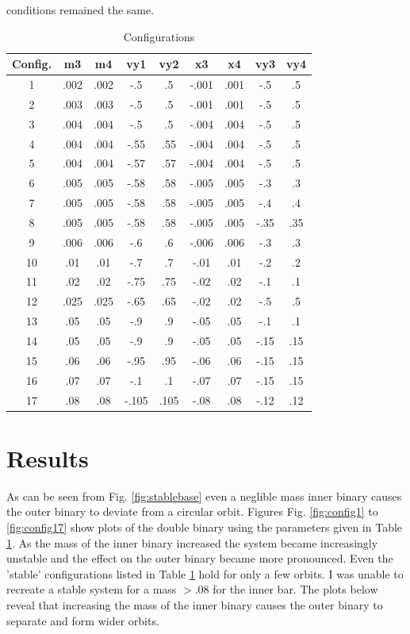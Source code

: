 \documentclass[a4paper,12pt]{article}
\begin{document}
conditions remained the same.
\begin{table}[ht!]
  \centering
  \caption{Configurations}
  \label{tab:variables}
  \begin{tabular}{ccccccccc}
   Config. & m3 & m4 & vy1 & vy2 & x3 & x4 & vy3 & vy4\\
    \hline
   1 & .002 & .002 & -.5 & .5 & -.001 & .001 & -.5 & .5\\
   2 & .003 & .003 & -.5 & .5 & -.001 & .001 & -.5 & .5\\
   3 & .004 & .004 & -.5 & .5 & -.004 & .004 & -.5 & .5\\
   4 & .004 & .004 & -.55 & .55 & -.004 & .004 & -.5 & .5\\
   5 & .004 & .004 & -.57 & .57 & -.004 & .004 & -.5 & .5\\
   6 & .005 & .005 & -.58 & .58 & -.005 & .005 & -.3 & .3\\
   7 & .005 & .005 & -.58 & .58 & -.005 & .005 & -.4 & .4\\
   8 & .005 & .005 & -.58 & .58 & -.005 & .005 & -.35 & .35\\
   9 & .006 & .006 & -.6 & .6 & -.006 & .006 & -.3 & .3\\
   10 & .01 & .01 & -.7 & .7 & -.01 & .01 & -.2 & .2\\
   11 & .02 & .02 & -.75 & .75 & -.02 & .02 & -.1 & .1\\
   12 & .025 & .025 & -.65 & .65 & -.02 & .02 & -.5 & .5\\
   13 & .05 & .05 & -.9 & .9 & -.05 & .05 & -.1 & .1\\
   14 & .05 & .05 & -.9 & .9 & -.05 & .05 & -.15 & .15\\
   15 & .06 & .06 & -.95 & .95 & -.06 & .06 & -.15 & .15\\
   16 & .07 & .07 & -.1 & .1 & -.07 & .07 & -.15 & .15\\
   17 & .08 & .08 & -.105 & .105 & -.08 & .08 & -.12 & .12\\
  \end{tabular}
\end{table}

\section{Results}
As can be seen from Fig. \ref{fig:stablebase} even a neglible mass inner binary causes the outer binary to deviate from a circular orbit.
Figures Fig. \ref{fig:config1} to \ref{fig:config17} show plots of the double binary using the parameters given in Table \ref{tab:variables}.
As the mass of the inner binary increased the system became increasingly unstable and the effect on the outer binary became more pronounced.
Even the 'stable' configurations listed in Table \ref{tab:variables} hold for only a few orbits.
I was unable to recreate a stable system for a mass $>.08$ for the inner bar.
The plots below reveal that increasing the mass of the inner binary causes the outer binary to separate and
form wider orbits.
\end{document}
